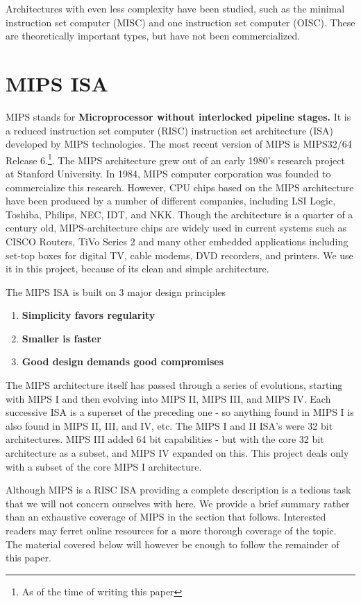 \documentclass[12pt]{report}
\begin{document}
Architectures with even less complexity have been studied, such as the minimal instruction set computer (MISC) and one instruction set computer (OISC). These are theoretically important types, but have not been commercialized.

\section{MIPS ISA}
   MIPS stands for \textbf{Microprocessor without interlocked pipeline stages.} It is a reduced instruction set computer (RISC) instruction set architecture (ISA) developed by MIPS technologies. The most recent version of MIPS is MIPS32/64 Release 6.\footnote{As of the time of writing this paper}. The MIPS architecture grew out of an early 1980's research project at Stanford University. In
1984, MIPS computer corporation was founded to commercialize this research. However, CPU
chips based on the MIPS architecture have been produced by a number of different companies,
including LSI Logic, Toshiba, Philips, NEC, IDT, and NKK. Though the architecture is a
quarter of a century old, MIPS-architecture chips are widely used in current systems such as
CISCO Routers, TiVo Series 2 and many other embedded applications including set-top boxes
for digital TV, cable modems, DVD recorders, and printers. We use it in this project, because of
its clean and simple architecture.

The MIPS ISA is built on 3 major design principles
\begin{enumerate}[i]
\item \textbf{Simplicity favors regularity}
\item \textbf{Smaller is faster}
\item \textbf{Good design demands good compromises}
\end{enumerate}
The MIPS architecture itself has passed through a series of evolutions, starting with MIPS I and then evolving into MIPS
II, MIPS III, and MIPS IV. Each successive ISA is a superset of the preceding one - so anything
found in MIPS I is also found in MIPS II, III, and IV, etc. The MIPS I and II ISA's were 32 bit
architectures. MIPS III added 64 bit capabilities - but with the core 32 bit architecture as a
subset, and MIPS IV expanded on this. This project deals only with a subset of the core MIPS
I architecture.

   
Although MIPS is a RISC ISA providing a complete description is a tedious task that we will not concern ourselves with here. We provide a brief summary rather than an exhaustive coverage of MIPS in the section that follows. Interested readers may ferret online resources for  a more thorough coverage of the topic. The material covered below will however be enough to follow the remainder of this paper.
\end{document}

